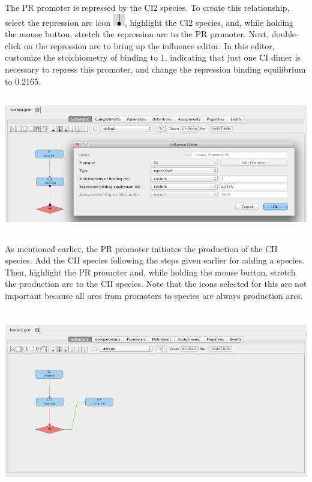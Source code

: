 \documentclass[titlepage,11pt]{article}
\begin{document}
The PR promoter is repressed by the CI2 species.  To create this relationship, select the repression arc icon 
\includegraphics{../gui/icons/modelview/inhibition_selected}, highlight the CI2 species, and, while holding the mouse button, stretch the repression arc to the PR promoter.  Next, double-click on the repression arc to bring up the influence editor.  In this editor, customize the stoichiometry of binding to 1, indicating that just one CI dimer is necessary to repress this promoter, and change the repression binding equilibrium to 0.2165.

\begin{center}
\includegraphics[height=60mm]{screenshots/repression} 
\end{center}

As mentioned earlier, the PR promoter initiates the production of the CII species.  Add the CII species following the steps given earlier for adding a species.  Then, highlight the PR promoter and, while holding the mouse button, stretch the production arc to the CII species.  Note that the icons selected for this are not important because all arcs from promoters to species are always production arcs.

\begin{center}
\includegraphics[height=80mm]{screenshots/production}
\end{center}
\end{document}
